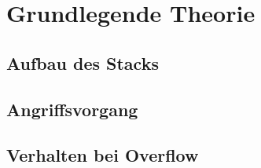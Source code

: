 \section{Grundlegende Theorie}
\subsection{Aufbau des Stacks}
\subsection{Angriffsvorgang}
\subsection{Verhalten bei Overflow}